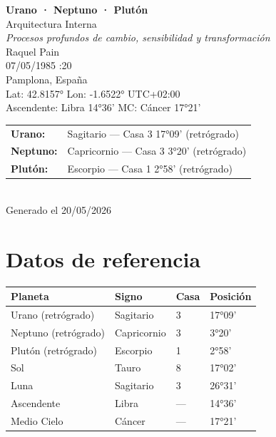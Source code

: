 \documentclass[11pt,a4paper]{article}
\begin{document}
\begin{titlepage}
  \centering
  \vspace*{1.5cm}
  {\Huge\bfseries\color{azulai} Urano · Neptuno · Plutón}\\[0.5cm]
  {\large\color{grisai} Arquitectura Interna}\\[0.3cm]
  {\small\itshape\color{grisai} Procesos profundos de cambio, sensibilidad y transformación}\\[2cm]
  {\huge\color{doradoai} Raquel Pain}\\[1.5cm]
  {\Large 07/05/1985 :20}\\[0.3cm]
  {\Large Pamplona, España}\\[0.3cm]
  {\normalsize Lat: 42.8157° \quad Lon: -1.6522° \quad UTC+02:00}\\[0.3cm]
  {\normalsize Ascendente: Libra 14°36' \quad
    MC: Cáncer 17°21'}\\[2cm]
  \begin{tabular}{ll}
    \textbf{Urano:}   & Sagitario — Casa 3 17°09' (retrógrado)  \\
    \textbf{Neptuno:} & Capricornio — Casa 3 3°20' (retrógrado) \\
    \textbf{Plutón:}  & Escorpio — Casa 1 2°58' (retrógrado) \\
  \end{tabular}\\[2cm]
  \vfill
  {\small Generado el 20/05/2026}
\end{titlepage}

\tableofcontents
\newpage

\section{Datos de referencia}

\begin{center}
\begin{tabular}{llll}
  \toprule
  \textbf{Planeta} & \textbf{Signo} & \textbf{Casa} & \textbf{Posición} \\
  \midrule
  Urano (retrógrado)    & Sagitario   & 3   & 17°09'  \\
  Neptuno (retrógrado) & Capricornio  & 3  & 3°20' \\
  Plutón (retrógrado)  & Escorpio  & 1  & 2°58' \\
  Sol              & Tauro  & 8  & 17°02' \\
  Luna             & Sagitario & 3 & 26°31' \\
  Ascendente       & Libra          & ---                   & 14°36' \\
  Medio Cielo      & Cáncer           & ---                   & 17°21' \\
  \bottomrule
\end{tabular}
\end{center}
\end{document}
